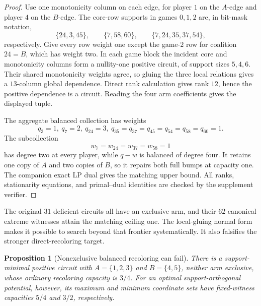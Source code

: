 \documentclass[11pt]{article}
\newtheorem{proposition}[theorem]{Proposition}
\begin{document}
\begin{proof}
Use one monotonicity column on each edge, for player $1$ on the $A$-edge and
player $4$ on the $B$-edge.  The core-row supports in games $0,1,2$ are,
in bit-mask notation,
\[
 \{24,3,45\},\qquad
 \{7,58,60\},\qquad
 \{7,24,35,37,54\},
\]
respectively.  Give every row weight one except the game-$2$ row for
coalition $24=B$, which has weight two.  In each game block the incident
core and monotonicity columns form a nullity-one positive circuit, of
support sizes $5,4,6$.  Their shared monotonicity weights agree, so gluing
the three local relations gives a $13$-column global dependence.  Direct
rank calculation gives rank $12$, hence the positive dependence is a
circuit.  Reading the four arm coefficients gives the displayed tuple.

The aggregate balanced collection has weights
\[
 q_3=1,\ q_7=2,\ q_{24}=3,\ q_{35}=q_{37}=q_{45}
 =q_{54}=q_{58}=q_{60}=1.
\]
The subcollection
\[
 w_7=w_{24}=w_{37}=w_{58}=1
\]
has degree two at every player, while $q-w$ is balanced of degree four.
It retains one copy of $A$ and two copies of $B$, so it repairs both full
bumps at capacity one.  The companion exact LP dual gives the matching
upper bound.  All ranks, stationarity equations, and primal--dual identities
are checked by the supplement verifier.
\end{proof}

The original $31$ deficient circuits all have an exclusive arm, and their
$62$ canonical extreme witnesses attain the matching ceiling one.  The
local-gluing normal form makes it possible to search beyond that frontier
systematically.  It also falsifies the stronger direct-recoloring target.

\begin{proposition}[Nonexclusive balanced recoloring can fail]
\label{prop:nonexclusive-deficient}
There is a support-minimal positive circuit with
$A=\{1,2,3\}$ and $B=\{4,5\}$, neither arm exclusive, whose ordinary
recoloring capacity is $3/4$.  For an optimal support-orthogonal potential,
however, its maximum and minimum coordinate sets have fixed-witness
capacities $5/4$ and $3/2$, respectively.
\end{proposition}
\end{document}
